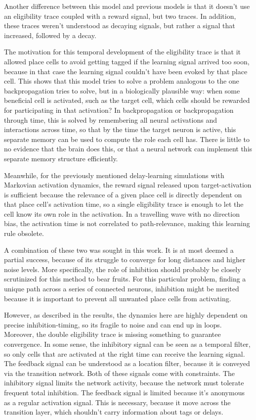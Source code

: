 \documentclass{article}
\begin{document}
    Another difference between this model and previous models is that it doesn't use an eligibility trace coupled with a reward signal, but two traces. In addition, these traces weren't understood as decaying signals, but rather a signal that increased, followed by a decay.

    The motivation for this temporal development of the eligibility trace is that it allowed place cells to avoid getting tagged if the learning signal arrived too soon, because in that case the learning signal couldn't have been evoked by that place cell. This shows that this model tries to solve a problem analogous to the one backpropagation tries to solve, but in a biologically plausible way: when some beneficial cell is activated, such as the target cell, which cells should be rewarded for participating in that activation?
    In backpropagation or backpropagation through time, this is solved by remembering all neural activations and interactions across time, so that by the time the target neuron is active, this separate memory can be used to compute the role each cell has. There is little to no evidence that the brain does this, or that a neural network can implement this separate memory structure efficiently. 

    Meanwhile, for the previously mentioned delay-learning simulations with Markovian activation dynamics, the reward signal released upon target-activation is sufficient because the relevance of a given place cell is directly dependent on that place cell's activation time, so a single eligibility trace is enough to let the cell know its own role in the activation. In a travelling wave with no direction bias, the activation time is not correlated to path-relevance, making this learning rule obsolete.

    A combination of these two was sought in this work. It is at most deemed a partial success, because of its struggle to converge for long distances and higher noise levels. More specifically, the role of inhibition should probably be closely scrutinized for this method to bear fruits. For this particular problem, finding a unique path across a series of connected neurons, inhibition might be merited because it is important to prevent all unwanted place cells from activating.

    However, as described in the results, the dynamics here are highly dependent on precise inhibition-timing, so its fragile to noise and can end up in loops. Moreover, the double eligibility trace is missing something to guarantee convergence. In some sense, the inhibitory signal can be seen as a temporal filter, so only cells that are activated at the right time can receive the learning signal. The feedback signal can be understood as a location filter, because it is conveyed via the transition network. Both of these signals come with constraints. The inhibitory signal limits the network activity, because the network must tolerate frequent total inhibition. The feedback signal is limited because it's anonymous as a regular activation signal. This is necessary, because it move across the transition layer, which shouldn't carry information about tags or delays.
\end{document}
